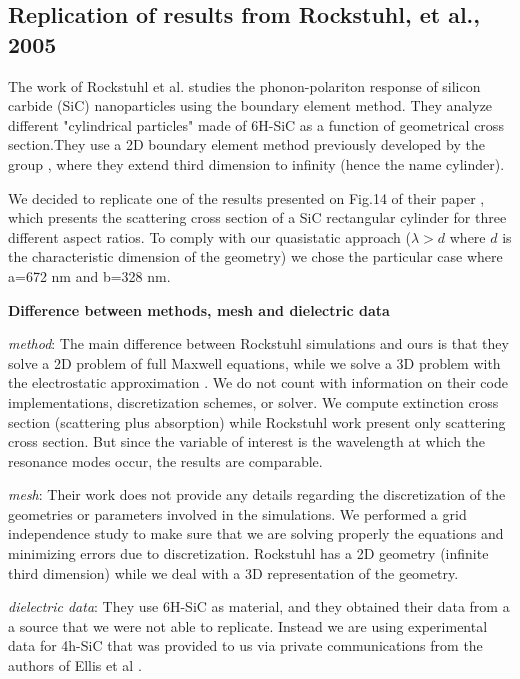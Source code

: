 
\subsection{Replication of results from Rockstuhl, et al., 2005}

The work of Rockstuhl et al.\cite{rockstuhl2005} studies the phonon-polariton response of silicon carbide (SiC)
nanoparticles using the boundary element method. They analyze different "cylindrical particles"
made of 6H-SiC as a function of geometrical cross section.They use a 2D boundary element method 
previously developed by the group \cite{rockstuhl2003}, where they extend third dimension to infinity
(hence the name cylinder).

We decided to replicate one of the results presented on Fig.14 of their paper \cite{rockstuhl2005}, which 
presents the scattering cross section of a SiC rectangular cylinder for three different aspect ratios. 
To comply with our quasistatic approach ($\lambda > d$ where $d$ is the characteristic
dimension of the geometry) we chose the particular case where a=672 nm and b=328 nm.

\textbf{Difference between methods, mesh and dielectric data}

\textit{method}: The main difference between Rockstuhl simulations and ours is that they solve a 2D problem of 
full Maxwell equations, while we solve a 3D problem with the electrostatic approximation . 
We do not count with information on their code implementations, discretization schemes, or solver.  
We compute extinction cross section (scattering plus absorption) while Rockstuhl work present only scattering
cross section. But since  the variable of interest is the wavelength at which the resonance modes occur, the 
results are comparable.

\textit{mesh}: Their work does not provide any details regarding the discretization of the geometries or 
parameters involved in the simulations.
We performed a grid independence study to make sure that we are solving properly the equations and 
minimizing errors due to discretization. Rockstuhl has a 2D geometry (infinite third dimension) while we deal 
with a 3D representation of the geometry. 

\textit{dielectric data}: They use 6H-SiC as material, and they obtained their data from a a source that we
were not able to replicate. Instead we are using experimental data for 4h-SiC that was provided to us 
via private communications from the authors of Ellis et al \cite{ellis2016}.  


